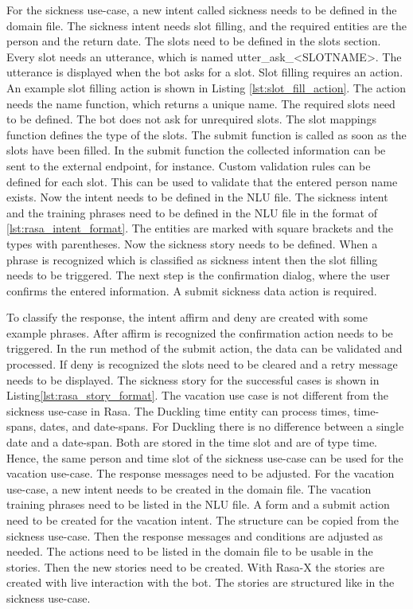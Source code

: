 For the sickness use-case, a new intent called sickness needs to be defined in the domain file.
The sickness intent needs slot filling, and the required entities are the 
person and the return date. 
The slots need to be defined in the slots section.
Every slot needs an utterance, which is named utter\_ask\_<SLOTNAME>.
The utterance is displayed when the bot asks for a slot.
Slot filling requires an action.
An example slot filling action is shown in Listing \ref{lst:slot_fill_action}.
The action needs the name function, which returns a unique name.
The required slots need to be defined.
The bot does not ask for unrequired slots.
The slot mappings function defines the type of the slots.
The submit function is called as soon as the slots have been filled.
In the submit function the collected information can be sent to the 
external endpoint, for instance.
Custom validation rules can be defined for each slot.
This can be used to validate that the entered person name exists.
Now the intent needs to be defined in the NLU file.
The sickness intent and the training phrases need to be defined in the 
NLU  file in the format of \ref{lst:rasa_intent_format}.
The entities are marked with square brackets and the types with parentheses.
Now the sickness story needs to be defined.
When a phrase is recognized which is classified as sickness intent then 
the slot filling needs to be triggered.
The next step is the confirmation dialog, where the user confirms the entered information.
A submit sickness data action is required.


To classify the response, the intent affirm and deny are created with some example phrases.
After affirm is recognized the confirmation action needs to be triggered.
In the run method of the submit action, the data can be validated and processed.
If deny is recognized the slots need to be cleared and a retry message needs to be displayed.
The sickness story for the successful cases is shown in Listing\ref{lst:rasa_story_format}.
The vacation use case is not different from the sickness use-case in Rasa.
The Duckling time entity can process times, time-spans, dates, and date-spans.
For Duckling there is no difference between a single date and a date-span.
Both are stored in the time slot and are of type time.
Hence, the same person and time slot of the sickness use-case can be used for the 
vacation use-case.
The response messages need to be adjusted.
For the vacation use-case, a new intent needs to be created in the domain file.
The vacation training phrases need to be listed in the NLU file.
A form and a submit action need to be created for the vacation intent.
The structure can be copied from the sickness use-case.
Then the response messages and conditions are adjusted as needed.
The actions need to be listed in the domain file to be usable in the stories.
Then the new stories need to be created.
With Rasa-X the stories are created with live interaction with the bot.
The stories are structured like in the sickness use-case.









